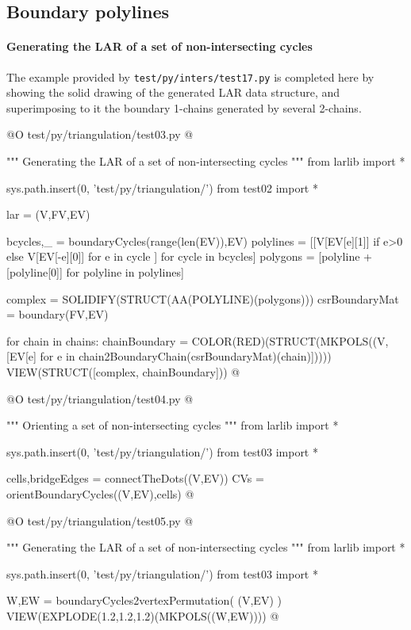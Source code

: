 \documentclass[11pt,oneside]{article}	%
\begin{document}
\subsection{Boundary polylines}

\paragraph{Generating the LAR of a set of non-intersecting cycles}
The example provided by \texttt{test/py/inters/test17.py} is completed here
by showing the solid drawing of the generated LAR data structure, and superimposing to it 
the boundary 1-chains generated by several 2-chains.

@O test/py/triangulation/test03.py
@{""" Generating the LAR of a set of non-intersecting cycles """
from larlib import *

sys.path.insert(0, 'test/py/triangulation/')
from test02 import *

lar = (V,FV,EV)

bcycles,_ = boundaryCycles(range(len(EV)),EV)
polylines = [[V[EV[e][1]] if e>0 else V[EV[-e][0]] for e in cycle ] for cycle in bcycles]
polygons = [polyline + [polyline[0]] for polyline in polylines]

complex = SOLIDIFY(STRUCT(AA(POLYLINE)(polygons)))
csrBoundaryMat = boundary(FV,EV)

for chain in chains:
    chainBoundary = COLOR(RED)(STRUCT(MKPOLS((V,[EV[e] 
                        for e in chain2BoundaryChain(csrBoundaryMat)(chain)]))))
    VIEW(STRUCT([complex, chainBoundary]))
@}

@O test/py/triangulation/test04.py
@{""" Orienting a set of non-intersecting cycles """
from larlib import *

sys.path.insert(0, 'test/py/triangulation/')
from test03 import *

cells,bridgeEdges = connectTheDots((V,EV))
CVs = orientBoundaryCycles((V,EV),cells)
@}

@O test/py/triangulation/test05.py
@{""" Generating the LAR of a set of non-intersecting cycles """
from larlib import *

sys.path.insert(0, 'test/py/triangulation/')
from test03 import *

W,EW = boundaryCycles2vertexPermutation( (V,EV) )
VIEW(EXPLODE(1.2,1.2,1.2)(MKPOLS((W,EW))))
@}
\end{document}
